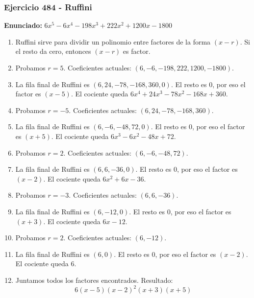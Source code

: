 \documentclass[11pt,a4paper]{article}
\begin{document}
\subsubsection*{Ejercicio 484 - Ruffini}
\textbf{Enunciado:} $ 6 x^{5} - 6 x^{4} - 198 x^{3} + 222 x^{2} + 1200 x - 1800 $\par
\begin{enumerate}[leftmargin=2em]
\item Ruffini sirve para dividir un polinomio entre factores de la forma \((x-r)\). Si el resto da cero, entonces \((x-r)\) es factor.
\item Probamos \(r=5\). Coeficientes actuales: \((6, -6, -198, 222, 1200, -1800)\).
\item La fila final de Ruffini es \((6, 24, -78, -168, 360, 0)\). El resto es \(0\), por eso el factor es \((x-5)\). El cociente queda \(6 x^{4} + 24 x^{3} - 78 x^{2} - 168 x + 360\).
\item Probamos \(r=-5\). Coeficientes actuales: \((6, 24, -78, -168, 360)\).
\item La fila final de Ruffini es \((6, -6, -48, 72, 0)\). El resto es \(0\), por eso el factor es \((x+5)\). El cociente queda \(6 x^{3} - 6 x^{2} - 48 x + 72\).
\item Probamos \(r=2\). Coeficientes actuales: \((6, -6, -48, 72)\).
\item La fila final de Ruffini es \((6, 6, -36, 0)\). El resto es \(0\), por eso el factor es \((x-2)\). El cociente queda \(6 x^{2} + 6 x - 36\).
\item Probamos \(r=-3\). Coeficientes actuales: \((6, 6, -36)\).
\item La fila final de Ruffini es \((6, -12, 0)\). El resto es \(0\), por eso el factor es \((x+3)\). El cociente queda \(6 x - 12\).
\item Probamos \(r=2\). Coeficientes actuales: \((6, -12)\).
\item La fila final de Ruffini es \((6, 0)\). El resto es \(0\), por eso el factor es \((x-2)\). El cociente queda \(6\).
\item Juntamos todos los factores encontrados. Resultado: \[\boxed{6 \left(x - 5\right) \left(x - 2\right)^{2} \left(x + 3\right) \left(x + 5\right)}\]
\end{enumerate}

\vspace{0.2cm}
\end{document}
